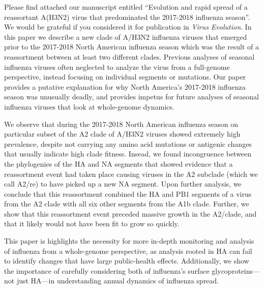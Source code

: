 \documentclass[stdletter,letterpaper,addrfromright,orderfromdateto,dateleft,11pt,noaddrto,sigleft]{newlfm}
\begin{document}
\begin{newlfm}
Please find attached our manuscript entitled ``Evolution and rapid spread of a reassortant A(H3N2) virus that predominated the 2017-2018 influenza season''.
We would be grateful if you considered it for publication in \textit{Virus Evolution}.
In this paper we describe a new clade of A/H3N2 influenza viruses that emerged prior to the 2017-2018 North American influenza season which was the result of a reassortment between at least two different clades.
Previous analyses of seasonal influenza viruses often neglected to analyze the virus from a full-genome perspective, instead focusing on individual segments or mutations.
Our paper provides a putative explanation for why North America's 2017-2018 influenza season was unusually deadly, and provides impetus for future analyses of seasonal influenza viruses that look at whole-genome dynamics.

We observe that during the 2017-2018 North American influenza season on particular subset of the A2 clade of A/H3N2 viruses showed extremely high prevalence, despite not carrying any amino acid mutations or antigenic changes that usually indicate high clade fitness.
Insead, we found incongruence between the phylogenies of the HA and NA segments that showed evidence that a reassortment event had taken place causing viruses in the A2 subclade (which we call A2/re) to have picked up a new NA segment.
Upon further analysis, we conclude that this reassortment combined the HA and PB1 segments of a virus from the A2 clade with all six other segments from the A1b clade.
Further, we show that this reassortment event preceded massive growth in the A2/clade, and that it likely would not have been fit to grow so quickly.

This paper is highlights the necessity for more in-depth monitoring and analysis of influenza from a whole-genome perspective, as analysis rooted in HA can fail to identify changes that have large public-health effects.
Additionally, we show the importance of carefully considering both of influenza's surface glycoproteins---not just HA---in understanding annual dynamics of influenza spread.


\end{newlfm}
\end{document}
